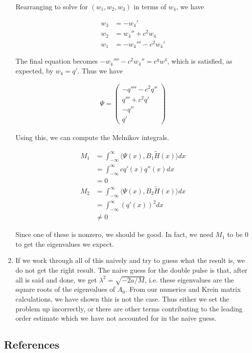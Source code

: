 \documentclass[12pt]{article}
\begin{document}
\begin{enumerate}
Rearranging to solve for $(w_1, w_2, w_3)$ in terms of $w_4$, we have

\begin{align*}
w_3 &= -w_4' \\
w_2 &= w_4'' + c^2 w_4 \\
w_1 &= -w_4''' - c^2 w_4'
\end{align*}

The final equation becomes $-w_4'''' - c^2 w_4'' = e^q w^4$, which is satisfied, as expected, by $w_4 = q'$. Thus we have

\begin{align*}
\Psi = \begin{pmatrix}
-q'''' - c^2 q''\\
q''' + c^2 q'\\
-q''\\
q'
\end{pmatrix}
\end{align*}

Using this, we can compute the Melnikov integrals.

\begin{align*}
M_1 &= \int_{-\infty}^\infty \langle \Psi(x), B_1 \tilde{H}(x) \rangle dx \\
&= \int_{-\infty}^\infty c q'(x) q''(x) dx \\
&= 0 \\
M_2 &= \int_{-\infty}^\infty \langle \Psi(x), B_2 \tilde{H}(x) \rangle dx \\
&= \int_{-\infty}^\infty  (q'(x))^2 dx \\
&\neq 0
\end{align*}

Since one of these is nonzero, we should be good. In fact, we need $M_1$ to be 0 to get the eigenvalues we expect.

\item If we work through all of this naively and try to guess what the result is, we do not get the right result. The naive guess for the double pulse is that, after all is said and done, we get $\lambda^2 = \sqrt{-2a / M}$, i.e. these eigenvalues are the square roots of the eigenvalues of $A_0$. From our numerics and Krein matrix calculations, we have shown this is not the case. Thus either we set the problem up incorrectly, or there are other terms contributing to the leading order estimate which we have not accounted for in the naive guess.


\end{enumerate}

\subsection{References}
\end{document}
